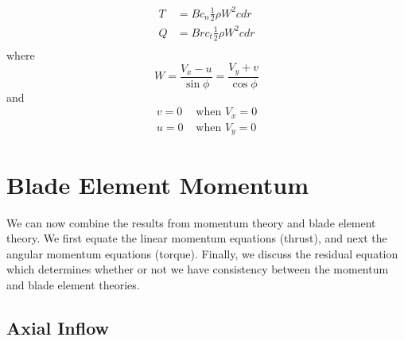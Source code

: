 \documentclass{article}
\begin{document}
\begin{equation}
\begin{aligned}
    T &= B c_n \frac{1}{2}\rho W^2 c dr \\
    Q &= B r c_t \frac{1}{2}\rho W^2 c dr \\
\end{aligned}
\label{eq:TQbe}
\end{equation}
where
\begin{equation}
    W = \frac{V_x  - u}{\sin \phi} = \frac{V_y + v}{\cos \phi}
    \label{eq:Woptions}
\end{equation}
and
\begin{align}
    v = 0 & \text{ when } V_x = 0\\
    u = 0 & \text{ when } V_y = 0
\end{align}




\section{Blade Element Momentum}

We can now combine the results from momentum theory and blade element theory.  We first equate the linear momentum equations (thrust), and next the angular momentum equations (torque).  Finally, we discuss the residual equation which determines whether or not we have consistency between the momentum and blade element theories.

\subsection{Axial Inflow}
\end{document}
